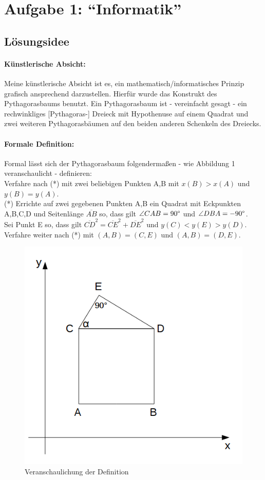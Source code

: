 \renewcommand{\deg}{\text{\textdegree{}}}

\section{Aufgabe 1: ``Informatik''}
\subsection{Lösungsidee}
\paragraph{Künstlerische Absicht:}
Meine künstlerische Absicht ist es, ein mathematisch/informatisches Prinzip grafisch ansprechend darzustellen.
Hierfür wurde das Konstrukt des Pythagorasbaums benutzt. Ein Pythagorasbaum ist - vereinfacht gesagt - ein rechwinkliges [Pythagoras-]
Dreieck mit Hypothenuse auf einem Quadrat und zwei weiteren Pythagorasbäumen auf den beiden anderen Schenkeln des Dreiecks.
\paragraph{Formale Definition:}
Formal lässt sich der Pythagorasbaum folgendermaßen - wie Abbildung 1 veranschaulicht - definieren:\smallskip  \\
Verfahre nach (*) mit zwei beliebigen Punkten A,B mit $x(B) > x(A)$ und $y(B)=y(A)$. \smallskip \\
(*) Errichte auf zwei gegebenen Punkten A,B ein Quadrat mit Eckpunkten A,B,C,D und Seitenlänge $\overline{AB}$ so,
dass gilt $\angle{CAB}=90\deg$ und $\angle{DBA}=-90\deg$. \smallskip \\
Sei Punkt E so, dass gilt $\overline{CD}^2 = \overline{CE}^2 + \overline{DE}^2$ und $y(C) < y(E) > y(D)$.
Verfahre weiter nach (*) mit $(A,B) = (C,E)$ und $(A,B) = (D,E)$.
\begin{figure}[ht]
\centering
 \includegraphics[width=.28\textwidth, height=.28\textwidth]{sketch.png}
\caption{Veranschaulichung der Definition}
\end{figure}
